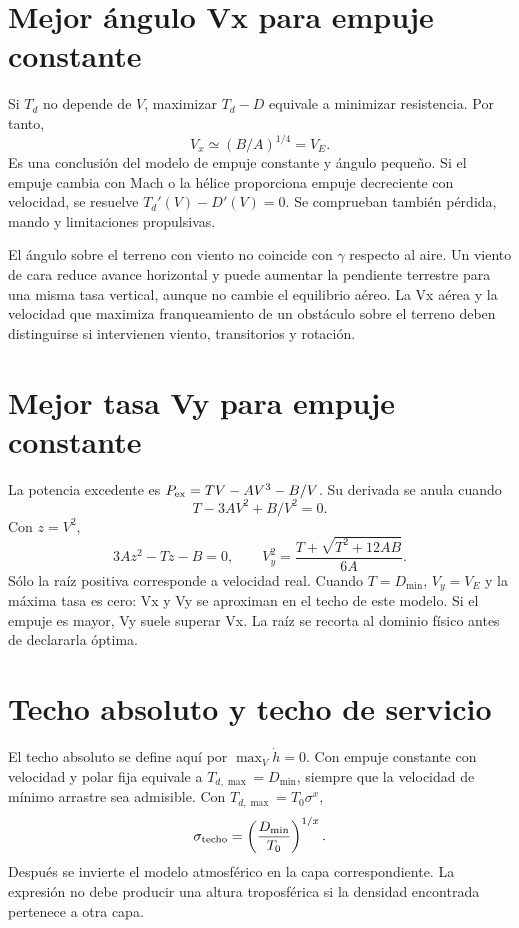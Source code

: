 \section{Mejor ángulo Vx para empuje constante}
Si $T_d$ no depende de $V$, maximizar $T_d-D$ equivale a minimizar resistencia. Por tanto,
\begin{equation}
V_x\simeq(B/A)^{1/4}=V_E.
\end{equation}
Es una conclusión del modelo de empuje constante y ángulo pequeño. Si el empuje cambia con Mach o la hélice proporciona empuje decreciente con velocidad, se resuelve $T_d'(V)-D'(V)=0$. Se comprueban también pérdida, mando y limitaciones propulsivas.

El ángulo sobre el terreno con viento no coincide con $\gamma$ respecto al aire. Un viento de cara reduce avance horizontal y puede aumentar la pendiente terrestre para una misma tasa vertical, aunque no cambie el equilibrio aéreo. La Vx aérea y la velocidad que maximiza franqueamiento de un obstáculo sobre el terreno deben distinguirse si intervienen viento, transitorios y rotación.

\section{Mejor tasa Vy para empuje constante}
La potencia excedente es $P_{\rm ex}=TV-AV^3-B/V$. Su derivada se anula cuando
\begin{equation}
T-3AV^2+B/V^2=0.
\end{equation}
Con $z=V^2$,
\begin{equation}
3Az^2-Tz-B=0,\qquad
V_y^2=\frac{T+\sqrt{T^2+12AB}}{6A}.\label{eq:Vy-jet}
\end{equation}
Sólo la raíz positiva corresponde a velocidad real. Cuando $T=D_{\min}$, $V_y=V_E$ y la máxima tasa es cero: Vx y Vy se aproximan en el techo de este modelo. Si el empuje es mayor, Vy suele superar Vx. La raíz se recorta al dominio físico antes de declararla óptima.


\section{Techo absoluto y techo de servicio}
El techo absoluto se define aquí por $\max_V\dot h=0$. Con empuje constante con velocidad y polar fija equivale a $T_{d,\max}=D_{\min}$, siempre que la velocidad de mínimo arrastre sea admisible. Con $T_{d,\max}=T_0\sigma^x$,
\begin{equation}
\sigma_{\rm techo}=\left(\frac{D_{\min}}{T_0}\right)^{1/x}.
\end{equation}
Después se invierte el modelo atmosférico en la capa correspondiente. La expresión no debe producir una altura troposférica si la densidad encontrada pertenece a otra capa.

